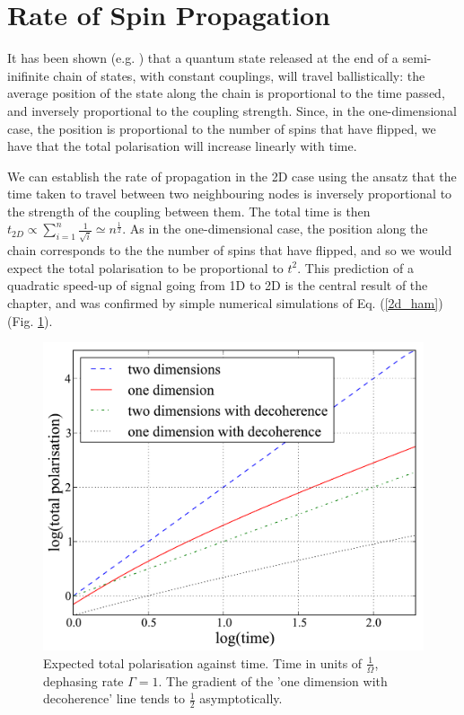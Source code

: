 \section{Rate of Spin Propagation}

It has been shown (e.g. \cite{Fitzsimons:2005p6472}) that a quantum state released at the end of a semi-inifinite chain of states, with constant couplings, will travel ballistically: the average position of the state along the chain is proportional to the time passed, and inversely proportional to the coupling strength. Since, in the one-dimensional case, the position is proportional to the number of spins that have flipped, we have that the total polarisation will increase linearly with time.

We can establish the rate of propagation in the 2D case using the ansatz that the time taken to travel between two neighbouring nodes is inversely proportional to the strength of the coupling between them. The total time is then $t_{2D}\propto \sum_{i=1}^{n}\frac{1}{\sqrt{i}}\simeq n^{\frac{1}{2}}$. As in the one-dimensional case, the position along the chain corresponds to the the number of spins that have flipped, and so we would expect the total polarisation to be proportional to $t^2$. This prediction of a quadratic speed-up of signal going from 1D to 2D is the central result of the chapter, and was confirmed by simple numerical simulations of Eq. (\ref{2d_ham}) (Fig. \ref{comparison}).

\begin{figure}
  \begin{center}
    \includegraphics[scale=0.7]{assets/comparison.pdf}
  \end{center}
  \caption{Expected total polarisation against time. Time in units of $\frac{1}{\Omega}$, dephasing rate $\Gamma = 1$. The gradient of the 'one dimension with decoherence' line tends to $\frac{1}{2}$ asymptotically.}
  \label{comparison}
\end{figure}

